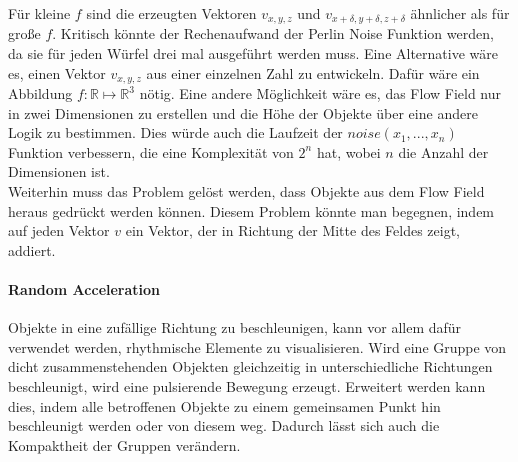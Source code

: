 \documentclass[11pt,a4paper]{article}
\begin{document}
\noindent
Für kleine $f$ sind die erzeugten Vektoren $v_{x, y, z}$ und $v_{x+\delta, y+\delta, z+\delta}$ ähnlicher als für große $f$. Kritisch könnte der Rechenaufwand der Perlin Noise Funktion werden, da sie für jeden Würfel drei mal ausgeführt werden muss. Eine Alternative wäre es, einen Vektor $v_{x, y, z}$ aus einer einzelnen Zahl zu entwickeln. Dafür wäre ein Abbildung $f: \mathbb{R} \mapsto \mathbb{R}^3$ nötig. Eine andere Möglichkeit wäre es, das Flow Field nur in zwei Dimensionen zu erstellen und die Höhe der Objekte über eine andere Logik zu bestimmen. Dies würde auch die Laufzeit der $noise(x_1, ..., x_n)$ Funktion verbessern, die eine Komplexität von $2^n$ hat, wobei $n$ die Anzahl der Dimensionen ist.\\
Weiterhin muss das Problem gelöst werden, dass Objekte aus dem Flow Field heraus gedrückt werden können. Diesem Problem könnte man begegnen, indem auf jeden Vektor $v$ ein Vektor, der in Richtung der Mitte des Feldes zeigt, addiert.

\paragraph{Random Acceleration}
Objekte in eine zufällige Richtung zu beschleunigen, kann vor allem dafür verwendet werden, rhythmische Elemente zu visualisieren. Wird eine Gruppe von dicht zusammenstehenden Objekten gleichzeitig in unterschiedliche Richtungen beschleunigt, wird eine pulsierende Bewegung erzeugt. Erweitert werden kann dies, indem alle betroffenen Objekte zu einem gemeinsamen Punkt hin beschleunigt werden oder von diesem weg. Dadurch lässt sich auch die Kompaktheit der Gruppen verändern.
\end{document}
